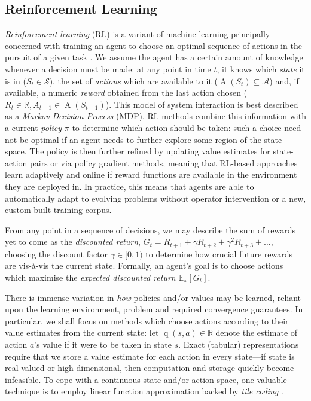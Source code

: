 \documentclass[10pt, times, comsoc]{IEEEtran}
\begin{document}
\subsection{Reinforcement Learning}\label{sec:reinforcement-learning}
\emph{Reinforcement learning} (RL) is a variant of machine learning principally concerned with training an agent to choose an optimal sequence of actions in the pursuit of a given task \cite{RL2E}.
We assume the agent has a certain amount of knowledge whenever a decision must be made: at any point in time $t$, it knows which \emph{state} it is in ($S_t \in \mathcal{S}$), the set of \emph{actions} which are available to it ($\operatorname{A}(S_t) \subseteq \mathcal{A}$) and, if available, a numeric \emph{reward} obtained from the last action chosen ($R_t \in \mathbb{R}, A_{t-1} \in \operatorname{A}(S_{t-1})$).
This model of system interaction is best described as a \emph{Markov Decision Process} (MDP).
RL methods combine this information with a current \emph{policy} $\pi$ to determine which action should be taken: such a choice need not be optimal if an agent needs to further explore some region of the state space.
The policy is then further refined by updating value estimates for state-action pairs or via policy gradient methods, meaning that RL-based approaches learn adaptively and online if reward functions are available in the environment they are deployed in.
In practice, this means that agents are able to automatically adapt to evolving problems without operator intervention or a new, custom-built training corpus.

From any point in a sequence of decisions, we may describe the sum of rewards yet to come as the \emph{discounted return}, $G_t = R_{t+1} + \gamma R_{t+2} + \gamma^2 R_{t+3} + \ldots$, choosing the discount factor $\gamma \in [0,1)$ to determine how crucial future rewards are vis-\`{a}-vis the current state.
Formally, an agent's goal is to choose actions which maximise the \emph{expected discounted return} $\operatorname{\mathbb{E}_{\pi}}[G_t]$.


There is immense variation in \emph{how} policies and/or values may be learned, reliant upon the learning environment, problem and required convergence guarantees.
In particular, we shall focus on methods which choose actions according to their value estimates from the current state: let $\operatorname{q}(s, a) \in \mathbb{R}$ denote the estimate of action $a$'s value if it were to be taken in state $s$.
Exact (tabular) representations require that we store a value estimate for each action in every state---if state is real-valued or high-dimensional, then computation and storage quickly become infeasible.
To cope with a continuous state and/or action space, one valuable technique is to employ linear function approximation backed by \emph{tile coding} \cite[pp.\ \numrange{217}{221}]{RL2E}.
\end{document}
